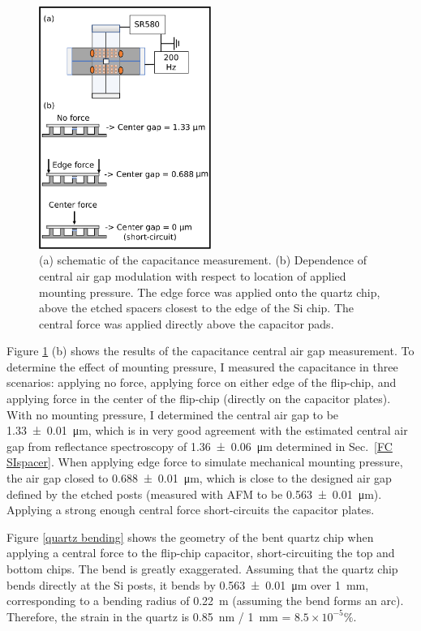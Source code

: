 \documentclass[double,12pt,1in,seploa]{beavtex}
\begin{document}
\begin{figure}
    \includegraphics[width = 0.5\textwidth]{FC capacitance measurement.pdf}
    \caption{(a) schematic of the capacitance measurement. (b) Dependence of central air gap modulation with respect to location of applied mounting pressure. The edge force was applied onto the quartz chip, above the etched spacers closest to the edge of the Si chip. The central force was applied directly above the capacitor pads.}
    \label{FC cap measurement}
\end{figure}



Figure \ref{FC cap measurement} (b) shows the results of the capacitance central air gap measurement. To determine the effect of mounting pressure, I measured the capacitance in three scenarios: applying no force, applying force on either edge of the flip-chip, and applying force in the center of the flip-chip (directly on the capacitor plates). With no mounting pressure, I determined the central air gap to be \SI{1.33(1)}{\micro\meter}, which is in very good agreement with the estimated central air gap from reflectance spectroscopy of \SI{1.36(6)}{\micro\meter} determined in Sec.\ \ref{FC SIspacer}. When applying edge force to simulate mechanical mounting pressure, the air gap closed to  \SI{0.688(10)}{\micro\meter}, which is close to the designed air gap defined by the etched posts (measured with AFM to be \SI{0.563(10)}{\micro\meter}). Applying a strong enough central force short-circuits the capacitor plates. 

Figure \ref{quartz bending} shows the geometry of the bent quartz chip when applying a central force to the flip-chip capacitor, short-circuiting the top and bottom chips. The bend is greatly exaggerated. Assuming that the quartz chip bends directly at the Si posts, it bends by \SI{0.563(10)}{\micro\meter} over \SI{1}{\milli\meter}, corresponding to a bending radius of \SI{0.22}{\meter} (assuming the bend forms an arc). Therefore, the strain in the quartz is \SI{0.85}{\nano\meter} / \SI{1}{\milli\meter} = $8.5 \times 10^{-5} \% $.
\end{document}
